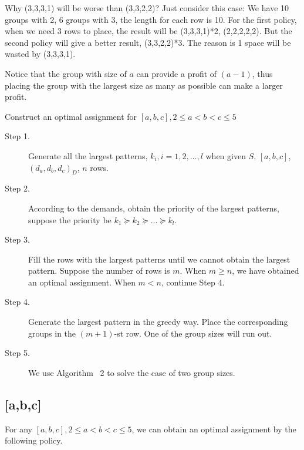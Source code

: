 
Why (3,3,3,1) will be worse than (3,3,2,2)?
Just consider this case: We have 10 groups with 2, 6 groups with 3, the length for each row is 10. For the first policy, when we need 3 rows to place, the result will be (3,3,3,1)*2, (2,2,2,2,2). But the second policy will give a better result, (3,3,2,2)*3. The reason is 1 space will be wasted by (3,3,3,1).

Notice that the group with size of $a$ can provide a profit of $(a-1)$, thus placing the group with the largest size as many as possible can make a larger profit.

\begin{algorithm}[H]\label{algo3}
\caption{Construct an optimal assignment for $[a,b,c], 2 \leq a<b<c \leq 5$}
\begin{description}
  \item[Step 1.] Generate all the largest patterns, $k_i,i=1,2,\ldots,l$ when given $S$, $[a,b,c]$, $(d_a,d_b,d_c)_D$, $n$ rows.
  \vspace{10pt}
  \item[Step 2.] According to the demands, obtain the priority of the largest patterns, suppose the priority be $k_1 \succeq k_2 \succeq \ldots \succeq k_l$.
	\vspace{10pt}
  \item[Step 3.] Fill the rows with the largest patterns until we cannot obtain the largest pattern. Suppose the number of rows is $m$. When $m \geq n$, we have obtained an optimal assignment. When $m <n$, continue Step 4.
  \item[Step 4.] Generate the largest pattern in the greedy way. Place the corresponding groups in the $(m+1)$-st row. One of the group sizes will run out.
  \item[Step 5.] We use Algorithm ~2 to solve the case of two group sizes.
\end{description}
\end{algorithm}

\subsection{[a,b,c]}

\begin{thm}
  For any $[a,b,c], 2 \leq a <b <c \leq 5$, we can obtain an optimal assignment by the following policy.
\end{thm}

